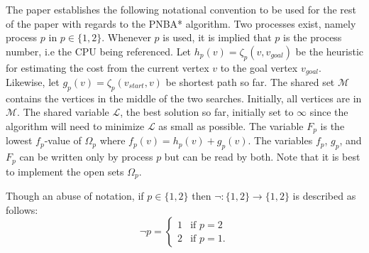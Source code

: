 The paper establishes the following notational convention to be used for the rest of the paper with regards to the PNBA* algorithm. 
Two processes exist, namely process $p$ in $p\in\{1,2\}$. Whenever $p$ is used, it is implied that $p$ is the process number, i.e the CPU being 
referenced. Let $h_p(v)=\zeta_p(v, v_{goal})$ be the heuristic for estimating the cost from the current vertex $v$ to the goal vertex $v_{goal}$.
Likewise, let $g_p(v)=\zeta_p(v_{start}, v)$ be shortest path so far. The shared set $\mathcal{M}$ contains the vertices in the middle of the two searches.
Initially, all vertices are in $\mathcal{M}$. The shared variable $\mathcal{L}$, the best solution so far, initially set to $\infty$ since 
the algorithm will need to minimize $\mathcal{L}$ as small as possible. The variable $F_p$ is the lowest $f_p$-value of $\Omega_p$ where $f_p(v)=h_p(v)+g_p(v)$.
The variables $f_p$, $g_p$, and $F_p$ can be written only by process $p$ but can be read by both. Note that it is best to implement the open sets $\Omega_p$.

Though an abuse of notation, if $p\in\{1,2\}$ then $\neg:\{1,2\}\to\{1,2\}$ is described as follows:
$$
\neg p=\begin{cases}
    1 & \text{if } p=2 \\ 
    2 & \text{if } p = 1.
\end{cases}
$$

